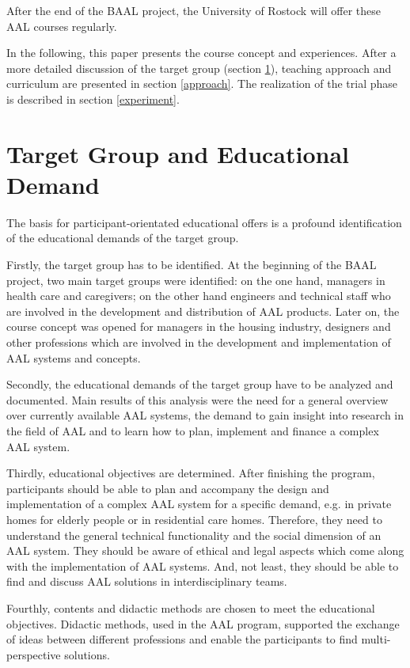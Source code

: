 \documentclass[runningheads,a4paper]{llncs}
\begin{document}
After the end of the BAAL project, the University of Rostock will offer these AAL courses regularly.

In the following, this paper presents the course concept and experiences. After a more detailed discussion of the target group (section \ref{target}), teaching approach and curriculum are presented in section \ref{approach}. The realization of the trial phase is described in section \ref{experiment}.

\section{Target Group and Educational Demand}\label{target}

The basis for participant-orientated educational offers is a profound identification of the educational demands of the target group.
 
Firstly, the target group has to be identified. At the beginning of the BAAL project, two main target groups were identified: on the one hand, managers in health care and caregivers; on the other hand engineers and technical staff who are involved in the development and distribution of AAL products. Later on, the course concept was opened for managers in the housing industry, designers and other professions which are involved in the development and implementation of AAL systems and concepts.

Secondly, the educational demands of the target group have to be analyzed and documented. Main results of this analysis were the need for a general overview over currently available AAL systems, the demand to gain insight into research in the field of AAL and to learn how to plan, implement and finance a complex AAL system.

Thirdly, educational objectives are determined. After finishing the program, participants should be able to plan and accompany the design and implementation of a complex AAL system for a specific demand, e.g. in private homes for elderly people or in residential care homes. Therefore, they need to understand the general technical functionality and the social dimension of an AAL system. They should be aware of ethical and legal aspects which come along with the implementation of AAL systems. And, not least, they should be able to find and discuss AAL solutions in interdisciplinary teams.

Fourthly, contents and didactic methods are chosen to meet the educational objectives. Didactic methods, used in the AAL program, supported the exchange of ideas between different professions and enable the participants to find multi-perspective solutions. 
\end{document}

